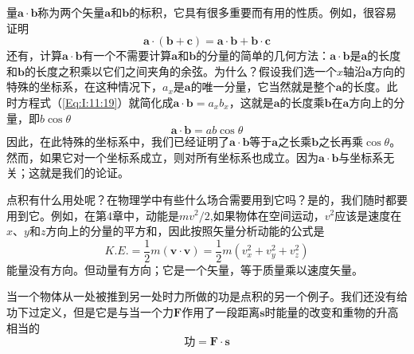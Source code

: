 量$\boldsymbol{a} \cdot \boldsymbol{b}$称为两个矢量$\boldsymbol{a}$和$\boldsymbol{b}$的标积，它具有很多重要而有用的性质。例如，很容易证明
\begin{equation}
    \label{Eq:I:11:21}
    \boldsymbol{a} \cdot (\boldsymbol{b}+\boldsymbol{c})=\boldsymbol{a} \cdot \boldsymbol{b}+\boldsymbol{b} \cdot \boldsymbol{c}
\end{equation}
还有，计算$\boldsymbol{a} \cdot \boldsymbol{b}$有一个不需要计算$\boldsymbol{a}$和$\boldsymbol{b}$的分量的简单的几何方法：$\boldsymbol{a} \cdot \boldsymbol{b}$是$\boldsymbol{a}$的长度和$\boldsymbol{b}$的长度之积乘以它们之间夹角的余弦。为什么？假设我们选一个$x$轴沿$\boldsymbol{a}$方向的特殊的坐标系，在这种情况下，$a_x$是$\boldsymbol{a}$的唯一分量，它当然就是整个$\boldsymbol{a}$的长度。此时方程式（\ref{Eq:I:11:19}）就简化成$\boldsymbol{a} \cdot \boldsymbol{b}=a_xb_x$，这就是$\boldsymbol{a}$的长度乘$\boldsymbol{b}$在$\boldsymbol{a}$方向上的分量，即$b\cos\theta$
\begin{equation*}
    \boldsymbol{a} \cdot \boldsymbol{b}=ab\cos\theta
\end{equation*}
因此，在此特殊的坐标系中，我们已经证明了$\boldsymbol{a} \cdot \boldsymbol{b}$等于$\boldsymbol{a}$之长乘$\boldsymbol{b}$之长再乘$\cos\theta$。然而，如果它对一个坐标系成立，则对所有坐标系也成立。因为$\boldsymbol{a} \cdot \boldsymbol{b}$与坐标系无关；这就是我们的论证。

点积有什么用处呢？在物理学中有些什么场合需要用到它吗？是的，我们随时都要用到它。例如，在第4章中，动能是$mv^2/2$,如果物体在空间运动，$v^2$应该是速度在$x$、$y$和$z$方向上的分量的平方和，因此按照矢量分析动能的公式是
\begin{equation}
    \label{Eq:I:11:22}
    K.E.=\frac{1}{2}m(\boldsymbol{v} \cdot \boldsymbol{v})=\frac{1}{2}m(v_x^2+v_y^2+v_z^2)
\end{equation}
能量没有方向。但动量有方向；它是一个矢量，等于质量乘以速度矢量。

当一个物体从一处被推到另一处时力所做的功是点积的另一个例子。我们还没有给功下过定义，但是它是与当一个力$\boldsymbol{F}$作用了一段距离$\boldsymbol{s}$时能量的改变和重物的升高相当的
\begin{equation}
    \label{Eq:I:11:23}
    \text{功}=\boldsymbol{F} \cdot \boldsymbol{s}
\end{equation}

